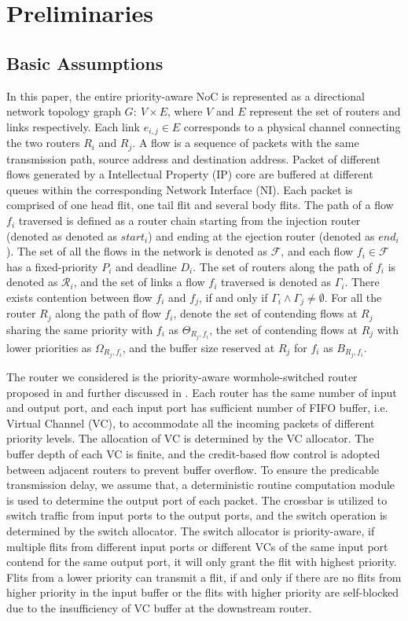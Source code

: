 \documentclass[10pt,journal]{IEEEtran}
\begin{document}
\section{Preliminaries}\label{model}
\subsection{Basic Assumptions}
In this paper, the entire priority-aware NoC is represented as a directional network topology graph $G:\ V\times E$, where $V$ and $E$ represent the set of routers and links respectively. Each link $e_{i,j}\in E$ corresponds to a physical channel connecting the two routers $R_i$ and $R_j$. A flow is a sequence of packets with the same transmission path, source address and destination address. Packet of different flows generated by a Intellectual Property (IP) core are buffered at different queues within the corresponding Network Interface (NI). Each packet is comprised of one head flit, one tail flit and several body flits. The path of a flow $f_i$ traversed is defined as a router chain starting from the injection router (denoted as denoted as $start_i$) and ending at the ejection router (denoted as $end_i$). The set of all the flows in the network is denoted as $\mathcal{F}$, and each flow $f_i\in\mathcal{F}$ has a fixed-priority $P_i$ and deadline $D_i$. The set of routers along the path of $f_i$ is denoted as $\mathcal{R}_i$, and the set of links a flow $f_i$ traversed is denoted as $\Gamma_i$. There exists contention between flow $f_i$ and $f_j$, if and only if $\Gamma_i\wedge\Gamma_j\neq\emptyset$. For all the router $R_j$ along the path of flow $f_i$, denote the set of contending flows at $R_j$ sharing the same priority with $f_i$ as $\Theta_{R_j,f_i}$, the set of contending flows at $R_j$ with lower priorities as $\Omega_{R_j,f_i}$, and the buffer size reserved at $R_j$ for $f_i$ as $B_{R_j,f_i}$.

The router we considered is the priority-aware wormhole-switched router proposed in \cite{Shi:2008:RCA:1397757.1397996} and further discussed in \cite{627905}\cite{707545}\cite{73}. Each router has the same number of input and output port, and each input port has sufficient number of FIFO buffer, i.e. Virtual Channel (VC), to accommodate all the incoming packets of different priority levels. The allocation of VC is determined by the VC allocator. The buffer depth of each VC is finite, and the credit-based flow control \cite{DaTo04} is adopted between adjacent routers to prevent buffer overflow. To ensure the predicable transmission delay, we assume that, a deterministic routine computation module is used to determine the output port of each packet. The crossbar is utilized to switch traffic from input ports to the output ports, and the switch operation is determined by the switch allocator. The switch allocator is priority-aware, if multiple flits from different input ports or different VCs of the same input port contend for the same output port, it will only grant the flit with highest priority. Flits from a lower priority can transmit a flit, if and only if there are no flits from higher priority in the input buffer or the flits with higher priority are self-blocked due to the insufficiency of VC buffer at the downstream router.
\end{document}
